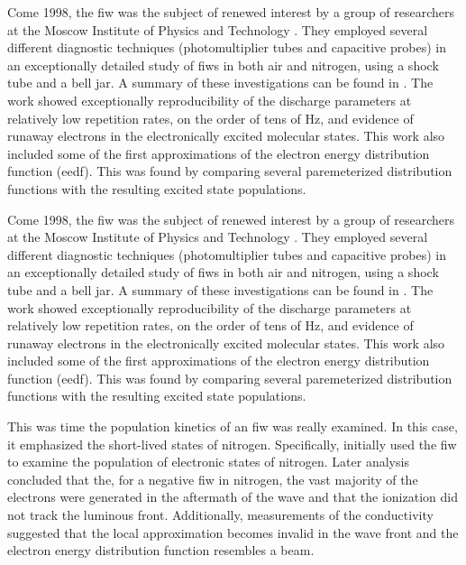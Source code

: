 Come 1998, the fiw was the subject of renewed interest by a group of
researchers at the Moscow Institute of Physics and Technology
\cite{Anikin1998}. They employed several different diagnostic techniques
(photomultiplier tubes and capacitive probes) in an exceptionally
detailed study of fiws in both air and nitrogen, using a shock tube and
a bell jar. A summary of these investigations can be found in
\cite{Starikovskaia2001}. The work showed exceptionally reproducibility
of the discharge parameters at relatively low repetition rates, on the
order of tens of Hz, and evidence of runaway electrons in the
electronically excited molecular states. This work also included some of
the first approximations of the electron energy distribution function
(\acs{eedf}). This was found by comparing several paremeterized
distribution functions with the resulting excited state populations.

Come 1998, the fiw was the subject of renewed interest by a group of researchers
at the Moscow Institute of Physics and Technology \cite{Anikin1998}. They
employed several different diagnostic techniques (photomultiplier tubes and
capacitive probes) in an exceptionally detailed study of fiws in both air and
nitrogen, using a shock tube and a bell jar. A summary of these investigations
can be found in \cite{Starikovskaia2001}. The work showed exceptionally
reproducibility of the discharge parameters at relatively low repetition rates,
on the order of tens of Hz, and evidence of runaway electrons in the
electronically excited molecular states. This work also included some of the
first approximations of the electron energy distribution function (\acs{eedf}).
This was found by comparing several paremeterized distribution functions with
the resulting excited state populations. 

This was time the population kinetics of an fiw was really examined. In this
case, it emphasized the short-lived states of nitrogen. Specifically,
\cite{Pancheshnyi1998} initially used the fiw to examine the population
of electronic states of nitrogen. Later analysis \cite{Pancheshnyi1999}
concluded that the, for a negative fiw in nitrogen, the vast majority of
the electrons were generated in the aftermath of the wave and that the
ionization did not track the luminous front. Additionally, measurements
of the conductivity suggested that the local approximation becomes
invalid in the wave front and the electron energy distribution function
resembles a beam.

